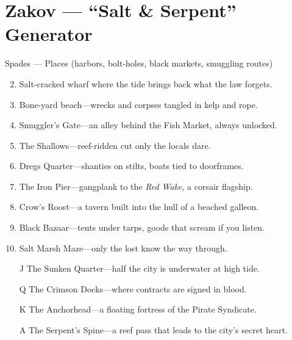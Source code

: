 \section{Zakov --- ``Salt \& Serpent'' Generator}

Spades --- Places (harbors, bolt-holes, black markets, smuggling routes)
\begin{enumerate}
\setcounter{enumi}{1}
\item Salt-cracked wharf where the tide brings back what the law forgets.
\item Bone-yard beach---wrecks and corpses tangled in kelp and rope.
\item Smuggler's Gate---an alley behind the Fish Market, always unlocked.
\item The Shallows---reef-ridden cut only the locals dare.
\item Dregs Quarter---shanties on stilts, boats tied to doorframes.
\item The Iron Pier---gangplank to the \textit{Red Wake}, a corsair flagship.
\item Crow's Roost---a tavern built into the hull of a beached galleon.
\item Black Bazaar---tents under tarps, goods that scream if you listen.
\item Salt Marsh Maze---only the lost know the way through.
\item[J] The Sunken Quarter---half the city is underwater at high tide.
\item[Q] The Crimson Docks---where contracts are signed in blood.
\item[K] The Anchorhead---a floating fortress of the Pirate Syndicate.
\item[A] The Serpent's Spine---a reef pass that leads to the city's secret heart.
\end{enumerate}

